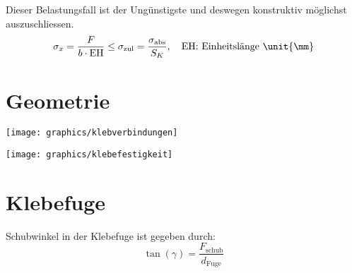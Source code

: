 		Dieser Belastungsfall ist der Un\-güns\-tigs\-te und deswegen konstruktiv mög\-lichst auszuschliessen.
		\begin{equation*}
			\sigma_x = \frac{F}{b \cdot \text{EH}} \leq \sigma_{\text{zul}} = \frac{\sigma_{\text{abs}}}{S_K}, \quad \text{EH: Einheitslänge \unit{\mm}}
		\end{equation*}
\section{Geometrie} %
	\texttt{[image: graphics/klebverbindungen]}
	
	\texttt{[image: graphics/klebefestigkeit]}
\section{Klebefuge} %
	Schubwinkel in der Klebefuge ist gegeben durch:
	\begin{equation*}
		\tan(\gamma) = \frac{F_\text{schub}}{d_\text{Fuge}}
	\end{equation*}
